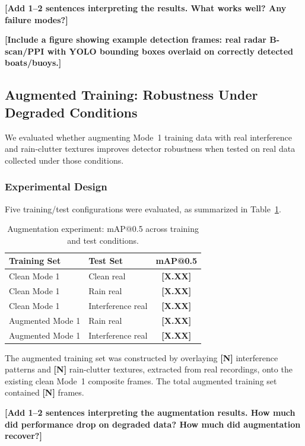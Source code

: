 \documentclass[conf]{new-aiaa}
\newcommand{\ph}[1]{\textbf{[#1]}}
\begin{document}
\ph{Add 1--2 sentences interpreting the results. What works well? Any failure modes?}

\ph{Include a figure showing example detection frames: real radar B-scan/PPI with YOLO bounding boxes overlaid on correctly detected boats/buoys.}

\subsection{Augmented Training: Robustness Under Degraded Conditions}

We evaluated whether augmenting Mode~1 training data with real interference and rain-clutter textures improves detector robustness when tested on real data collected under those conditions.

\subsubsection{Experimental Design}

Five training/test configurations were evaluated, as summarized in Table~\ref{tab:augmentation}.

\begin{table}[htb]
\centering
\caption{Augmentation experiment: mAP@0.5 across training and test conditions.}
\label{tab:augmentation}
\begin{tabular}{@{}llc@{}}
\toprule
\textbf{Training Set} & \textbf{Test Set} & \textbf{mAP@0.5} \\
\midrule
Clean Mode 1 & Clean real & \ph{X.XX} \\
Clean Mode 1 & Rain real & \ph{X.XX} \\
Clean Mode 1 & Interference real & \ph{X.XX} \\
Augmented Mode 1 & Rain real & \ph{X.XX} \\
Augmented Mode 1 & Interference real & \ph{X.XX} \\
\bottomrule
\end{tabular}
\end{table}

The augmented training set was constructed by overlaying \ph{N} interference patterns and \ph{N} rain-clutter textures, extracted from real recordings, onto the existing clean Mode~1 composite frames. The total augmented training set contained \ph{N} frames.

\ph{Add 1--2 sentences interpreting the augmentation results. How much did performance drop on degraded data? How much did augmentation recover?}
\end{document}
